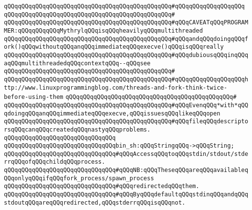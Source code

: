\verb|qQQqqQQqqQQqqQQqqQQqqQQqqQQqqQQqqQQqqQQqqQQqqQQq#qQQqqQQqqQQqqQQqqQQq|\newline
\verb|qQQqqQQqqQQqqQQqqQQqqQQqqQQqqQQqqQQqqQQqqQQqqQQq#|\newline
\verb|qQQqqQQqqQQqqQQqqQQqqQQqqQQqqQQqqQQqqQQqqQQqqQQq#qQQqCAVEATqQQqPROGRAMMER:qQQqqQQqqQQqMythrylqQQqisqQQqheavilyqQQqmultithreaded|\newline
\verb|qQQqqQQqqQQqqQQqqQQqqQQqqQQqqQQqqQQqqQQqqQQqqQQq#qQQqandqQQqdoingqQQqfork()qQQqwithoutqQQqanqQQqimmediateqQQqexecve()qQQqisqQQqreally|\newline
\verb|qQQqqQQqqQQqqQQqqQQqqQQqqQQqqQQqqQQqqQQqqQQqqQQq#qQQqdubiousqQQqinqQQqaqQQqmultithreadedqQQqcontextqQQq--qQQqsee|\newline
\verb|qQQqqQQqqQQqqQQqqQQqqQQqqQQqqQQqqQQqqQQqqQQqqQQq#|\newline
\verb|qQQqqQQqqQQqqQQqqQQqqQQqqQQqqQQqqQQqqQQqqQQqqQQq#qQQqqQQqqQQqqQQqqQQqhttp://www.linuxprogrammingblog.com/threads-and-fork-think-twice-before-using-them|\newline
\verb|qQQqqQQqqQQqqQQqqQQqqQQqqQQqqQQqqQQqqQQqqQQqqQQq#|\newline
\verb|qQQqqQQqqQQqqQQqqQQqqQQqqQQqqQQqqQQqqQQqqQQqqQQq#qQQqEvenqQQq*with*qQQqdoingqQQqanqQQqimmediateqQQqexecve,qQQqissuesqQQqlikeqQQqopen|\newline
\verb|qQQqqQQqqQQqqQQqqQQqqQQqqQQqqQQqqQQqqQQqqQQqqQQq#qQQqfileqQQqdescriptorsqQQqcanqQQqcreatedqQQqnastyqQQqproblems.|\newline
\newline
\verb|qQQqqQQqqQQqqQQqqQQqqQQqqQQqqQQq|\newline
\newline
\verb|qQQqqQQqqQQqqQQqqQQqqQQqqQQqqQQqbin_sh:qQQqStringqQQq->qQQqString;|\newline
\newline
\verb|qQQqqQQqqQQqqQQqqQQqqQQqqQQqqQQq#qQQqAccessqQQqtoqQQqstdin/stdout/stderrqQQqofqQQqchildqQQqprocess.|\newline
\verb|qQQqqQQqqQQqqQQqqQQqqQQqqQQqqQQq#qQQqNB:qQQqTheseqQQqareqQQqavailableqQQqonlyqQQqifqQQqfork_process/spawn_process|\newline
\verb|qQQqqQQqqQQqqQQqqQQqqQQqqQQqqQQq#qQQqredirectedqQQqthem.|\newline
\verb|qQQqqQQqqQQqqQQqqQQqqQQqqQQqqQQq#qQQqByqQQqdefaultqQQqstdinqQQqandqQQqstdoutqQQqareqQQqredirected,qQQqstderrqQQqisqQQqnot.|\newline
